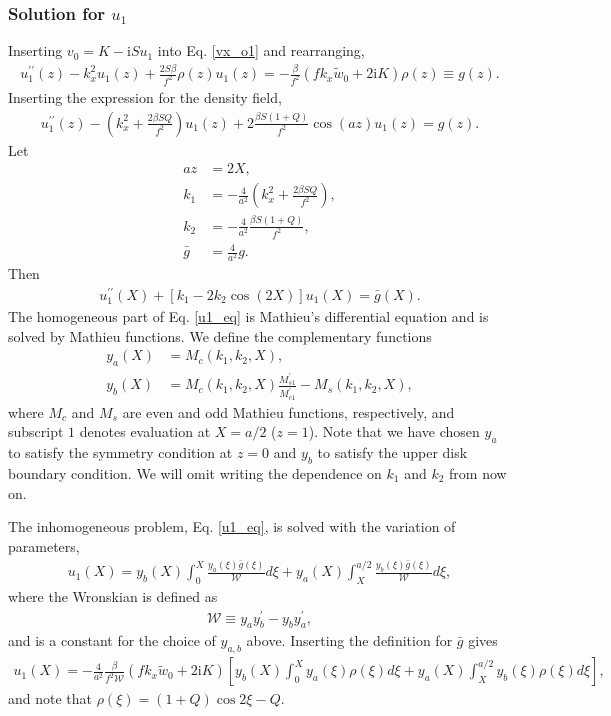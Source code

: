 \documentclass[12pt,preprint]{aastex}
\newcommand{\imgi}{\mathrm{i}}
\begin{document}
\subsubsection{Solution for $u_1$} 
Inserting $v_0 = K - \imgi S u_1$ into Eq. \ref{vx_o1} and
rearranging, 
\begin{align}
  u_1^{\prime\prime}(z) - k_x^2u_1(z) +
  \frac{2S\beta}{f^2}\rho(z)u_1(z) =
  -\frac{\beta}{f^2}\left(fk_x\tilde{w}_0 + 2\imgi K\right)\rho(z)\equiv
  g(z).  
\end{align}
Inserting the expression for the density field,
\begin{align}
  u_1^{\prime\prime}(z) - \left( k_x^2 + \frac{2\beta S
    Q}{f^2}\right)u_1(z) + 2\frac{\beta S(1+Q)}{f^2}\cos{(az)}
  u_1(z) = g(z). 
\end{align}
Let
\begin{align}
  az &= 2X,\\
  k_1 & =  -\frac{4}{a^2}\left( k_x^2 + \frac{2\beta S
    Q}{f^2}\right),\\
  k_2 & = -\frac{4}{a^2}\frac{\beta S(1+Q)}{f^2},\\
  \bar{g} &= \frac{4}{a^2} g.
\end{align}
Then
\begin{align}
  u_1^{\prime\prime}(X) + \left[k_1 - 2k_2\cos{\left(2X\right)} \right]u_1(X) =
  \bar{g}(X). \label{u1_eq} 
\end{align}
The homogeneous part of Eq. \ref{u1_eq} is Mathieu's differential
equation and is solved by Mathieu functions. We define the
complementary functions
\begin{align}
  y_a(X) &= M_c(k_1, k_2, X),\\
  y_b(X) &= M_c(k_1, k_2, X)\frac{M_{s1}^\prime}{M_{c1}^\prime} -
  M_s(k_1, k_2, X),  
\end{align}
where $M_c$ and $M_s$ are even and odd Mathieu functions,
respectively, and subscript $1$ denotes evaluation at $X=a/2$
($z=1$). Note that we have chosen $y_a$ to satisfy the symmetry
condition at $z=0$ and $y_b$ to satisfy the upper disk boundary
condition. We will omit writing the dependence on $k_1$ and $k_2$ from
now on. 

The inhomogeneous problem, Eq. \ref{u1_eq}, is solved with the
variation of parameters,
\begin{align}
  u_1(X) =
  y_b(X)\int_0^X\frac{y_a(\xi)\bar{g}(\xi)}{\mathcal{W}}d\xi +
  y_a(X) \int_X^{a/2}\frac{y_b(\xi)\bar{g}(\xi)}{\mathcal{W}}d\xi, 
\end{align} 
where the Wronskian is defined as 
\begin{align}
  \mathcal{W} \equiv y_ay_b^\prime - y_by_a^\prime,
\end{align}
and is a constant for the choice of $y_{a,b}$ above. Inserting the
definition for $\bar{g}$ gives
\begin{align}
  u_1(X) = -\frac{4}{a^2}\frac{\beta}{f^2\mathcal{W}}\left(fk_x\tilde{w}_0 +
  2\imgi K \right)\left[
    y_b(X)\int_0^X y_a(\xi)\rho(\xi) d\xi +
    y_a(X) \int_X^{a/2}y_b(\xi)\rho(\xi)d\xi
    \right],\label{u1_explicit}
\end{align} 
and note that $\rho(\xi) = (1+Q)\cos{2\xi} - Q$. 
\end{document}
